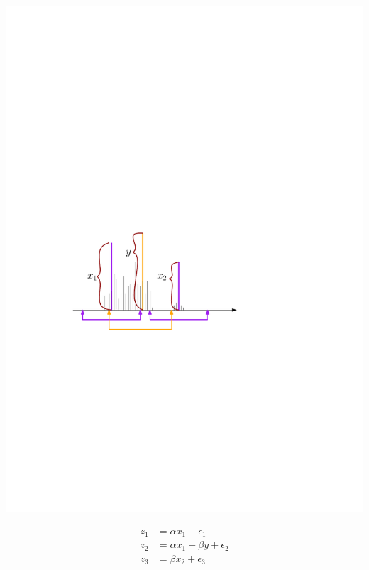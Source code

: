 \documentclass[xetex]{beamer}
\begin{document}
	\begin{frame}[plain]
	    \begin{center}
	        \includegraphics[height=.5\textheight,keepaspectratio]{./picts/sticks2}
	    \end{center}

		\begin{align*}
			z_1 &= \alpha x_1 + \epsilon_1 \\
	    	z_2 &= \alpha x_1 + \beta y + \epsilon_2 \\
	    	z_3 &= \beta x_2 + \epsilon_3 
		\end{align*}

	\end{frame}
\end{document}
